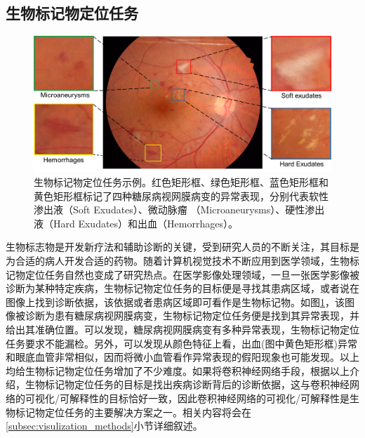 \subsection{生物标记物定位任务}
\begin{figure}[h]
	\centering
	\includegraphics[width=1.0\textwidth]{figure/biomarker_localization_example}
	\caption{生物标记物定位任务示例。红色矩形框、绿色矩形框、蓝色矩形框和黄色矩形框标记了四种糖尿病视网膜病变的异常表现，分别代表软性渗出液（Soft Exudates）、微动脉瘤
		（Microaneurysms）、硬性渗出液（Hard Exudates）和出血（Hemorrhages）。} 
	\label{fig:biomarker_localization_example}
\end{figure}
生物标志物是开发新疗法和辅助诊断的关键，受到研究人员的不断关注，其目标是为合适的病人开发合适的药物。随着计算机视觉技术不断应用到医学领域，生物标记物定位任务自然也变成了研究热点。在医学影像处理领域，一旦一张医学影像被诊断为某种特定疾病，生物标记物定位任务的目标便是寻找其患病区域，或者说在图像上找到诊断依据，该依据或者患病区域即可看作是生物标记物。如图\ref{fig:biomarker_localization_example}，该图像被诊断为患有糖尿病视网膜病变，生物标记物定位任务便是找到其异常表现，并给出其准确位置。可以发现，糖尿病视网膜病变有多种异常表现，生物标记物定位任务要求不能漏检。另外，可以发现从颜色特征上看，出血(图中黄色矩形框)异常和眼底血管非常相似，因而将微小血管看作异常表现的假阳现象也可能发现。以上均给生物标记物定位任务增加了不少难度。如果将卷积神经网络手段，根据以上介绍，生物标记物定位任务的目标是找出疾病诊断背后的诊断依据，这与卷积神经网络的可视化/可解释性的目标恰好一致，因此卷积神经网络的可视化/可解释性是生物标记物定位任务的主要解决方案之一。相关内容将会在\ref{subsec:visulization_methods}小节详细叙述。
